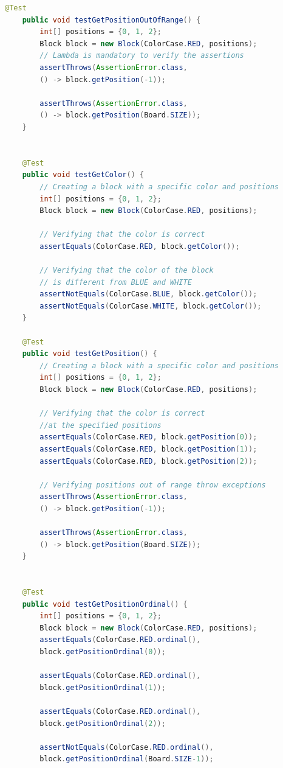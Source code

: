 \documentclass[a4paper,11pt]{article}
\begin{document}
\begin{lstlisting}[language=Java]
    @Test
    public void testGetPositionOutOfRange() {
        int[] positions = {0, 1, 2};
        Block block = new Block(ColorCase.RED, positions);
        // Lambda is mandatory to verify the assertions
        assertThrows(AssertionError.class,
        () -> block.getPosition(-1));
        
        assertThrows(AssertionError.class,
        () -> block.getPosition(Board.SIZE));
    }


    @Test
    public void testGetColor() {
        // Creating a block with a specific color and positions
        int[] positions = {0, 1, 2};
        Block block = new Block(ColorCase.RED, positions);
        
        // Verifying that the color is correct
        assertEquals(ColorCase.RED, block.getColor());

        // Verifying that the color of the block
        // is different from BLUE and WHITE
        assertNotEquals(ColorCase.BLUE, block.getColor());
        assertNotEquals(ColorCase.WHITE, block.getColor());
    }

    @Test
    public void testGetPosition() {
        // Creating a block with a specific color and positions
        int[] positions = {0, 1, 2};
        Block block = new Block(ColorCase.RED, positions);
        
        // Verifying that the color is correct
        //at the specified positions
        assertEquals(ColorCase.RED, block.getPosition(0));
        assertEquals(ColorCase.RED, block.getPosition(1));
        assertEquals(ColorCase.RED, block.getPosition(2));
        
        // Verifying positions out of range throw exceptions
        assertThrows(AssertionError.class,
        () -> block.getPosition(-1));
        
        assertThrows(AssertionError.class,
        () -> block.getPosition(Board.SIZE));
    }


    @Test
    public void testGetPositionOrdinal() {
        int[] positions = {0, 1, 2};
        Block block = new Block(ColorCase.RED, positions);
        assertEquals(ColorCase.RED.ordinal(), 
        block.getPositionOrdinal(0));
        
        assertEquals(ColorCase.RED.ordinal(),
        block.getPositionOrdinal(1));
        
        assertEquals(ColorCase.RED.ordinal(),
        block.getPositionOrdinal(2));
        
        assertNotEquals(ColorCase.RED.ordinal(),
        block.getPositionOrdinal(Board.SIZE-1));
        

\end{lstlisting}
\end{document}
